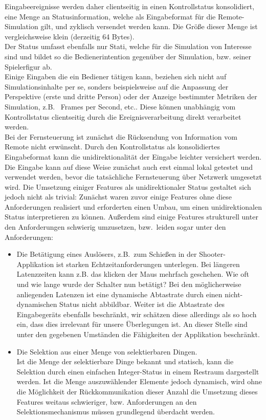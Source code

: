 Eingabeereignisse werden daher clientseitig in einen Kontrollstatus konsolidiert, eine Menge an Statusinformation, welche als Eingabeformat für die Remote-Simulation gilt, und zyklisch versendet werden kann. Die Größe dieser Menge ist vergleichsweise klein (derzeitig 64 Bytes).\\
Der Status umfasst ebenfalls nur Stati, welche für die Simulation von Interesse sind und bildet so die Bedienerintention gegenüber der Simulation, bzw. seiner Spielerfigur ab.\\
Einige Eingaben die ein Bediener tätigen kann, beziehen sich nicht auf Simulationsinhalte per se, sonders beispielsweise auf die Anpassung der Perspektive (erste und dritte Person) oder der Anzeige bestimmter Metriken der Simulation, z.B.~ Frames per Second, etc.. Diese können unabhängig vom Kontrollstatus clientseitig durch die Ereignisverarbeitung direkt verarbeitet werden.\\

Bei der Fernsteuerung ist zunächst die Rücksendung von Information vom Remote nicht erwünscht. Durch den Kontrollstatus als konsolidiertes Eingabeformat kann die unidirektionalität der Eingabe leichter versichert werden. Die Eingabe kann auf diese Weise zunächst auch erst einmal lokal getestet und verwendet werden, bevor die tatsächliche Fernsteuerung über Netzwerk umgesetzt wird.
Die Umsetzung einiger Features als unidirektionaler Status gestaltet sich jedoch nicht als trivial:
Zunächst waren zuvor einige Features ohne diese Anforderungen realisiert und erforderten einen Umbau, um einen unidirektionalen Status interpretieren zu können.
Außerdem sind einige Features strukturell unter den Anforderungen schwierig umzusetzen, bzw.~leiden sogar unter den Anforderungen:
\begin{itemize}
\item Die Betätigung eines Auslösers, z.B.~zum Schießen in der Shooter-Applikation ist starken Echtzeitanforderungen unterlegen. Bei längeren Latenzzeiten kann z.B. das klicken der Maus mehrfach geschehen. Wie oft und wie lange wurde der Schalter nun betätigt? Bei den möglicherweise anliegenden Latenzen ist eine dynamische Abtastrate durch einen nicht-dynamischen Status nicht abbildbar. Weiter ist die Abtastrate des Eingabegeräts ebenfalls beschränkt, wir schätzen diese allerdings als so hoch ein, dass dies irrelevant für unsere Überlegungen ist. An dieser Stelle sind unter den gegebenen Umständen die Fähigkeiten der Applikation beschränkt.
\item Die Selektion aus einer Menge von selektierbaren Dingen.\\
Ist die Menge der selektierbare Dinge bekannt und statisch, kann die Selektion durch einen einfachen Integer-Status  in einem Restraum dargestellt werden. Ist die Menge auszuwählender Elemente jedoch dynamisch, wird ohne die Möglichkeit der Rückkommunikation dieser Anzahl die Umsetzung dieses Features weitaus schwieriger, bzw. Anforderungen an den Selektionsmechanismus müssen grundlegend überdacht werden.
\end{itemize}

